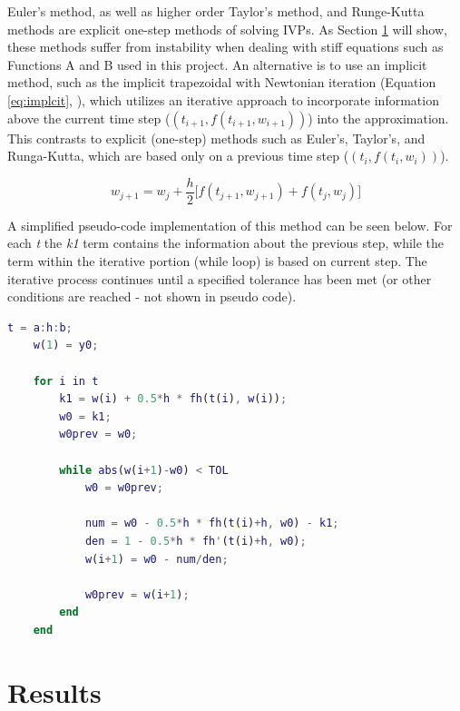 \documentclass{article}
\begin{document}
Euler's method, as well as higher order Taylor's method, and Runge-Kutta methods are explicit one-step methods of solving IVPs. As Section \ref{sec:results} will show, these methods suffer from instability when dealing with stiff equations such as Functions A and B used in this project. An alternative is to use an implicit method, such as the implicit trapezoidal with Newtonian iteration (Equation \ref{eq:implcit}, \citep{burden2010}), which utilizes an iterative approach to incorporate information above the current time step ($(t_{i+1}, f(t_{i+1}, w_{i+1}))$) into the approximation. This contrasts to explicit (one-step) methods such as Euler's, Taylor's, and Runga-Kutta, which are based only on a previous time step ($(t_{i}, f(t_{i}, w_{i}))$). 

\begin{center}
	\begin{equation}
	w_{j+1} = w_j + \frac{h}{2} \big[ f(t_{j+1}, w_{j+1}) + f(t_{j}, w_{j}) \big]
	\label{eq:implcit}
	\end{equation}
\end{center}

A simplified pseudo-code implementation of this method can be seen below. For each \textit{t} the \textit{k1} term contains the information about the previous step, while the term within the iterative portion (while loop) is based on current step. The iterative process continues until a specified tolerance has been met (or other conditions are reached - not shown in pseudo code).

\bigskip
\begin{center}
\footnotesize
\begin{lstlisting}[language=Matlab]
    t = a:h:b;
    w(1) = y0;

    for i in t
        k1 = w(i) + 0.5*h * fh(t(i), w(i));
        w0 = k1;
        w0prev = w0;

        while abs(w(i+1)-w0) < TOL
            w0 = w0prev;

            num = w0 - 0.5*h * fh(t(i)+h, w0) - k1;
            den = 1 - 0.5*h * fh'(t(i)+h, w0);
            w(i+1) = w0 - num/den;

            w0prev = w(i+1);
        end    
    end
\end{lstlisting}
\end{center}
\bigskip




\newpage
\section{Results}
\label{sec:results}
\end{document}
